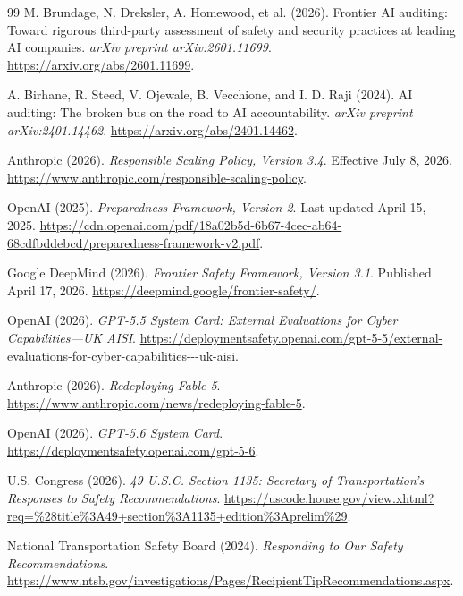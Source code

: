 \documentclass{article}
\begin{document}
\begin{thebibliography}{99}
M. Brundage, N. Dreksler, A. Homewood, et al. (2026).
Frontier AI auditing: Toward rigorous third-party assessment of safety and security practices at leading AI companies.
\emph{arXiv preprint arXiv:2601.11699}.
\url{https://arxiv.org/abs/2601.11699}.

A. Birhane, R. Steed, V. Ojewale, B. Vecchione, and I. D. Raji (2024).
AI auditing: The broken bus on the road to AI accountability.
\emph{arXiv preprint arXiv:2401.14462}.
\url{https://arxiv.org/abs/2401.14462}.

Anthropic (2026).
\emph{Responsible Scaling Policy, Version 3.4}.
Effective July 8, 2026.
\url{https://www.anthropic.com/responsible-scaling-policy}.

OpenAI (2025).
\emph{Preparedness Framework, Version 2}.
Last updated April 15, 2025.
\url{https://cdn.openai.com/pdf/18a02b5d-6b67-4cec-ab64-68cdfbddebcd/preparedness-framework-v2.pdf}.

Google DeepMind (2026).
\emph{Frontier Safety Framework, Version 3.1}.
Published April 17, 2026.
\url{https://deepmind.google/frontier-safety/}.

OpenAI (2026).
\emph{GPT-5.5 System Card: External Evaluations for Cyber Capabilities---UK AISI}.
\url{https://deploymentsafety.openai.com/gpt-5-5/external-evaluations-for-cyber-capabilities---uk-aisi}.

Anthropic (2026).
\emph{Redeploying Fable 5}.
\url{https://www.anthropic.com/news/redeploying-fable-5}.

OpenAI (2026).
\emph{GPT-5.6 System Card}.
\url{https://deploymentsafety.openai.com/gpt-5-6}.

U.S. Congress (2026).
\emph{49 U.S.C. Section 1135: Secretary of Transportation's Responses to Safety Recommendations}.
\url{https://uscode.house.gov/view.xhtml?req=%28title%3A49+section%3A1135+edition%3Aprelim%29}.

National Transportation Safety Board (2024).
\emph{Responding to Our Safety Recommendations}.
\url{https://www.ntsb.gov/investigations/Pages/RecipientTipRecommendations.aspx}.


\end{thebibliography}
\end{document}
